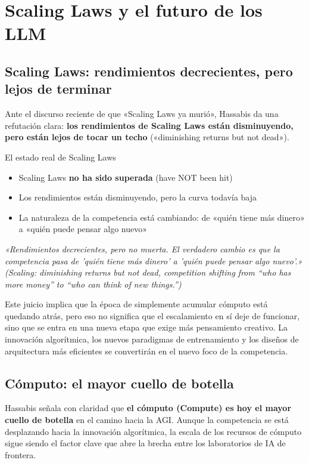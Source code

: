 \section{Scaling Laws y el futuro de los LLM}

\subsection{Scaling Laws: rendimientos decrecientes, pero lejos de terminar}

Ante el discurso reciente de que «Scaling Laws ya murió», Hassabis da una refutación clara: \textbf{los rendimientos de Scaling Laws están disminuyendo, pero están lejos de tocar un techo} («diminishing returns but not dead»).

\begin{importantbox}{El estado real de Scaling Laws}
\begin{itemize}
    \item Scaling Laws \textbf{no ha sido superada} (have NOT been hit)
    \item Los rendimientos están disminuyendo, pero la curva todavía baja
    \item La naturaleza de la competencia está cambiando: de «quién tiene más dinero» a «quién puede pensar algo nuevo»
\end{itemize}
\textit{«Rendimientos decrecientes, pero no muerta. El verdadero cambio es que la competencia pasa de 'quién tiene más dinero' a 'quién puede pensar algo nuevo'.» (Scaling: diminishing returns but not dead, competition shifting from ``who has more money'' to ``who can think of new things.'')}
\end{importantbox}

Este juicio implica que la época de simplemente acumular cómputo está quedando atrás, pero eso no significa que el escalamiento en sí deje de funcionar, sino que se entra en una nueva etapa que exige más pensamiento creativo. La innovación algorítmica, los nuevos paradigmas de entrenamiento y los diseños de arquitectura más eficientes se convertirán en el nuevo foco de la competencia.

\subsection{Cómputo: el mayor cuello de botella}

Hassabis señala con claridad que \textbf{el cómputo (Compute) es hoy el mayor cuello de botella} en el camino hacia la AGI. Aunque la competencia se está desplazando hacia la innovación algorítmica, la escala de los recursos de cómputo sigue siendo el factor clave que abre la brecha entre los laboratorios de IA de frontera.


